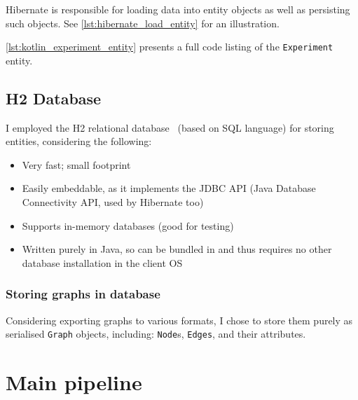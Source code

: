 \begin{itemize}[topsep=5pt,label=$\boldsymbol{\rightarrow}$]
    Hibernate is responsible for loading data into entity objects as well as persisting such objects.
    See \autoref{lst:hibernate_load_entity} for an illustration.

    
\end{itemize}


\autoref{lst:kotlin_experiment_entity} presents a full code listing of the \texttt{Experiment} entity.



\subsection{H2 Database}

I employed the H2 relational database~\cite{MuellerH2DatabaseEngine2006} (based on SQL language) for storing entities, considering the following:
\begin{itemize}[topsep=5pt]
    \item Very fast; small footprint
    \item Easily embeddable, as it implements the JDBC API (Java Database Connectivity API, used by Hibernate too)
    \item Supports in-memory databases (good for testing)
    \item Written purely in Java, so can be bundled in \graffs and thus requires no other database installation in the client OS
\end{itemize}

\subsubsection*{Storing graphs in database}

Considering exporting graphs to various formats, I chose to store them purely as serialised \texttt{Graph} objects, including: \texttt{Node}s, \texttt{Edges}, and their attributes.


\section{Main pipeline}\label{sec:main_pipeline}

